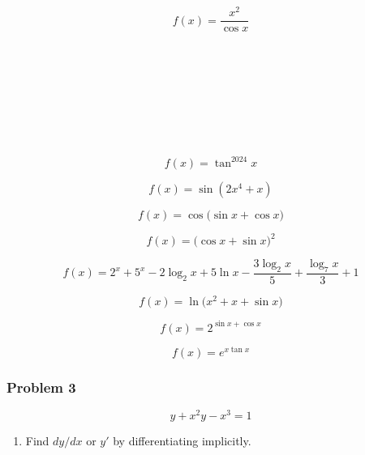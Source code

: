\documentclass[
  letterpaper,
  DIV=11,
  numbers=noendperiod]{scrartcl}
\providecommand{\tightlist}{%
  \setlength{\itemsep}{0pt}\setlength{\parskip}{0pt}}\usepackage{longtable,booktabs,array}
\begin{document}
\[f(x) = \frac{x^2}{\cos x}\]\\
\strut \\
\strut \\
\strut \\
\strut \\

\[f(x) = \tan^{2024} x\]

\hfill\break
\hfill\break
\hfill\break
\hfill\break
\hfill\break

\[f(x) = \sin(2x^4 + x)\]

\hfill\break
\hfill\break
\hfill\break
\hfill\break
\hfill\break

\thispagestyle{empty}

\[f(x) = \cos\bigg(\sin x + \cos x \bigg)\]

\hfill\break
\hfill\break
\hfill\break
\hfill\break
\hfill\break

\[f(x) = \bigg(\cos x+\sin x\bigg)^{2}\]

\hfill\break
\hfill\break
\hfill\break
\hfill\break
\hfill\break

\[f(x) = 2^x + 5^x - 2\log_{2}x + 5\ln x - \frac{3\log_2 x}{5} + \frac{\log_7 x}{3} + 1\]

\hfill\break
\hfill\break
\hfill\break
\hfill\break
\hfill\break

\[f(x) = \ln\bigg(x^2+x+ \sin x\bigg)\]

\hfill\break
\hfill\break
\hfill\break
\hfill\break
\hfill\break

\thispagestyle{empty}

\[f(x) = 2^{\sin x + \cos x}\]

\hfill\break
\hfill\break
\hfill\break
\hfill\break
\hfill\break

\[f(x) = e^{x\tan x}\]

\hfill\break
\hfill\break
\hfill\break
\hfill\break
\hfill\break

\subsubsection{Problem 3}\label{problem-3}

\[
y + x^2y - x^3 = 1
\]

\begin{enumerate}
\def\labelenumi{(\alph{enumi})}
\tightlist
\item
  Find \(dy/dx\) or \(y'\) by differentiating implicitly.
\end{enumerate}

\hfill\break
\hfill\break
\hfill\break
\hfill\break
\hfill\break
\hfill\break
\hfill\break
\hfill\break
\hfill\break
\hfill\break
\hfill\break
\hfill\break
\hfill\break
\hfill\break
\end{document}
